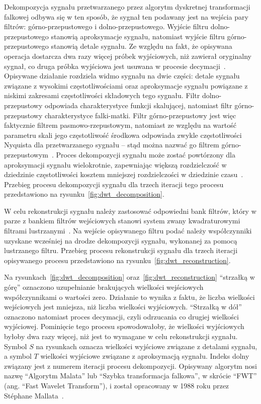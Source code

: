 Dekompozycja sygnału przetwarzanego przez algorytm dyskretnej transformacji falkowej odbywa się w ten sposób, że sygnał ten podawany jest na wejścia pary filtrów: górno-przepustowego i dolno-przepustowego. Wyjście filtru dolno-przepustowego stanowią aproksymacje sygnału, natomiast wyjście filtru górno-przepustowego stanowią detale sygnału. Ze względu na fakt, że opisywana operacja dostarcza dwa razy więcej próbek wyjściowych, niż zawierał oryginalny sygnał, co druga próbka wyjściowa jest usuwana w procesie decymacji~\cite{lord_guide}. Opisywane działanie rozdziela widmo sygnału na dwie części: detale sygnału związane z wysokimi częstotliwościami oraz aproksymacje sygnału powiązane z niskimi zakresami częstotliwości składowych tego sygnału. Filtr dolno-przepustowy odpowiada charakterystyce funkcji skalującej, natomiast filtr górno-przepustowy charakterystyce falki-matki. Filtr górno-przepustowy jest więc faktycznie filtrem pasmowo-rzepustowym, natomiast ze względu na wartość parametru skali jego częstotliwość środkowa odpowiada zwykle częstotliwości Nyquista dla przetwarzanego sygnału -- stąd można nazwać go filtrem górno-przepustowym~\cite{ahmad_wavelet}. Proces dekompozycji sygnału może zostać powtórzony dla aproksymacji sygnału wielokrotnie, zapewniając większą rozdzielczość w dziedzinie częstotliwości kosztem mniejszej rozdzielczości w dziedzinie czasu~\cite{vonesch_dbbasics}. Przebieg procesu dekompozycji sygnału dla trzech iteracji tego procesu przedstawiono na rysunku~\ref{fig:dwt_decomposition}.

W celu rekonstrukcji sygnału należy zastosować odpowiedni bank filtrów, który w parze z bankiem filtrów wejściowych stanowi system zwany kwadraturowymi filtrami lustrzanymi~\cite{johnston_filter}. Na wejście opisywanego filtru podać należy współczynniki uzyskane wcześniej na drodze dekompozycji sygnału, wykonanej za pomocą lustrzanego filtru. Przebieg procesu rekonstrukcji sygnału dla trzech iteracji opisywanego procesu przedstawiono na rysunku~\ref{fig:dwt_reconstruction}.

Na rysunkach~\ref{fig:dwt_decomposition} oraz~\ref{fig:dwt_reconstruction} \enquote{strzałką w górę} oznaczono uzupełnianie brakujących wielkości wejściowych współczynnikami o wartości zero. Działanie to wynika z faktu, że liczba wielkości wejściowych jest mniejsza, niż liczba wielkości wyjściowych. \enquote{Strzałką w dół} oznaczono natomiast proces decymacji, czyli odrzucania co drugiej wielkości wyjściowej. Pominięcie tego procesu spowodowałoby, że wielkości wyjściowych byłoby dwa razy więcej, niż jest to wymagane w celu rekonstrukcji sygnału. Symbol $S$ na rysunkach oznacza wielkości wyjściowe związane z detalami sygnału, a symbol $T$ wielkości wyjściowe związane z aproksymacją sygnału. Indeks dolny związany jest z numerem iteracji procesu dekompozycji. Opisywany algorytm nosi nazwę \enquote{Algorytm Malata} lub \enquote{Szybka transformacja falkowa}, w skrócie \enquote{FWT} (ang. \enquote{Fast Wavelet Transform}), i został opracowany w 1988 roku przez Stéphane Mallata~\cite{mallat_wavelet, lujian_mallat}.

